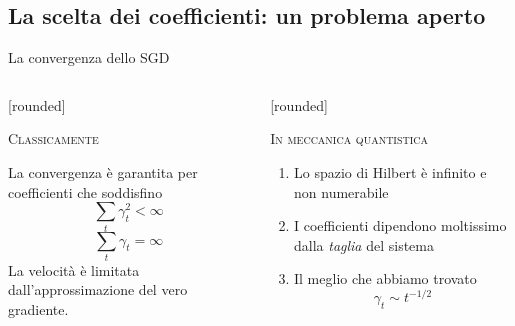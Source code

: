 \documentclass[xcolor=x11names,compress]{beamer}
\renewcommand{\(}{\begin{columns}}
\renewcommand{\)}{\end{columns}}
\newcommand{\<}[1]{\begin{column}{#1}}
\renewcommand{\>}{\end{column}}
\begin{document}
\subsection{La scelta dei coefficienti: un problema aperto}
\begin{frame}{La convergenza dello SGD}

\vspace{-0.2cm}

\begin{columns}[c]
\begin{column}{0.35\textwidth}

[rounded]

\vspace{0.4cm}

\begin{block}{\textsc{Classicamente}}

\scriptsize\textcolor{textCWI}{La convergenza è garantita per coefficienti che soddisfino
$$\sum_t \gamma_t^2 < \infty$$
$$\sum_t \gamma_t = \infty$$
La velocità è limitata dall'approssimazione del vero gradiente.
}
\end{block}
\end{column}

\hspace{0pt}

\begin{column}{0.35\textwidth}

[rounded]


\begin{block}{\small{\textsc{In meccanica quantistica}}}
\scriptsize{
\begin{enumerate}
  \item  \textcolor{textCWI}{Lo spazio di Hilbert è infinito e non numerabile} 
  \item  \textcolor{textCWI}{ I coefficienti dipendono moltissimo dalla \emph{taglia} del sistema}
  \item  \textcolor{textCWI}{Il meglio che abbiamo trovato $$\gamma_t \sim t^{-1/2}$$}
\end{enumerate}
}
\end{block}
\end{column}


\end{columns}
\end{frame}
\end{document}
